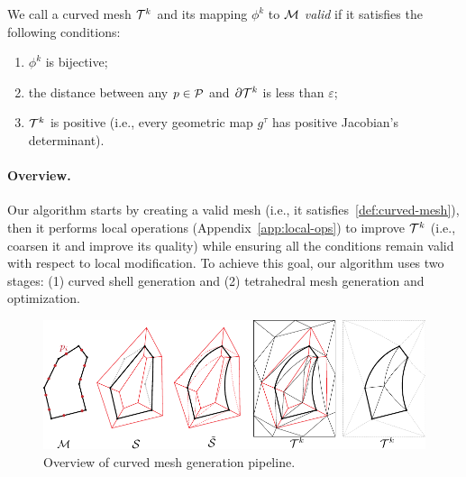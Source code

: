 \begin{definition}\label{def:curved-mesh}
We call a curved mesh $\T^k$ and its mapping $\phi^k$ to $\M$ \emph{valid} if it satisfies the following conditions:
\begin{enumerate}
    \item $\phi^k$ is bijective;
    \item the distance between any $p\in\P$ and $\partial\T^k$ is less than $\varepsilon$;
    \item $\T^k$ is positive (i.e., every geometric map $g^\tau$ has positive Jacobian's determinant).
\end{enumerate}
\end{definition}

\paragraph{Overview.} 
Our algorithm starts by creating a valid mesh (i.e., it satisfies~\ref{def:curved-mesh}), then it performs local operations (Appendix~\ref{app:local-ops}) to improve $\T^k$ (i.e., coarsen it and improve its quality) while ensuring all the conditions remain valid with respect to local modification. 
To achieve this goal, our algorithm uses two stages: (1) curved shell generation and (2) tetrahedral mesh generation and optimization.

\begin{figure}
    \centering
    \includegraphics[width=\linewidth]{curve_meshing_in_shell_tex/figs/illustrations/pipeline.pdf}
    \caption{Overview of curved mesh generation pipeline.}
    \label{bichon:fig:pipeline}
\end{figure}


